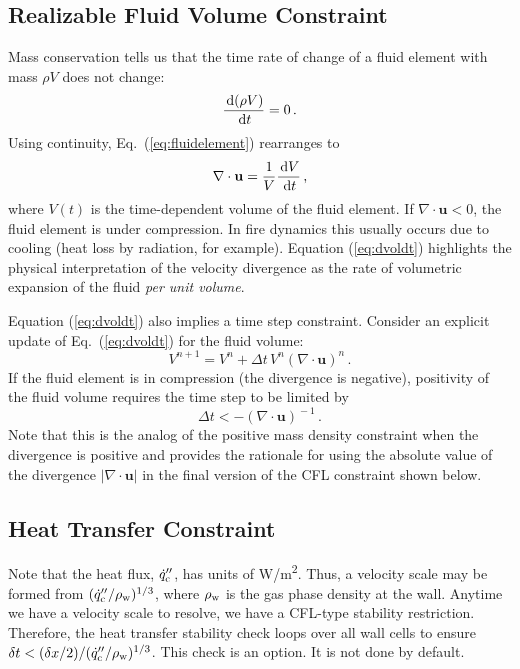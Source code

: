 \subsection{Realizable Fluid Volume Constraint}

Mass conservation tells us that the time rate of change of a fluid element with mass $\rho V$ does not change:
\begin{equation}
\label{eq:fluidelement}
\frac{\,\mathrm{d} (\rho V)}{\,\mathrm{d} t} = 0 \,\mbox{.}
\end{equation}
Using continuity, Eq.~(\ref{eq:fluidelement}) rearranges to
\begin{equation}
\label{eq:dvoldt}
\nabla\cdot\mathbf{u} = \frac{1}{V} \frac{\,\mathrm{d} V}{\,\mathrm{d} t} \,\mbox{,}
\end{equation}
where $V(t)$ is the time-dependent volume of the fluid element.  If $\nabla\cdot\mathbf{u}<0$, the fluid element is under compression.  In fire dynamics this usually occurs due to cooling (heat loss by radiation, for example).  Equation (\ref{eq:dvoldt}) highlights the physical interpretation of the velocity divergence as the rate of volumetric expansion of the fluid \emph{per unit volume}.

Equation (\ref{eq:dvoldt}) also implies a time step constraint.  Consider an explicit update of Eq.~(\ref{eq:dvoldt}) for the fluid volume:
\begin{equation}
V^{n+1} = V^n + \Delta t \, V^n (\nabla\cdot\mathbf{u})^{\!n} \,\mbox{.}
\end{equation}
If the fluid element is in compression (the divergence is negative), positivity of the fluid volume requires the time step to be limited by
\begin{equation}
\label{eq:volumedtrestriction}
\Delta t < -(\nabla\cdot\mathbf{u})^{\!-1} \,\mbox{.}
\end{equation}
Note that this is the analog of the positive mass density constraint when the divergence is positive and provides the rationale for using the absolute value of the divergence $|\nabla\cdot\mathbf{u}|$ in the final version of the CFL constraint shown below.

\subsection{Heat Transfer Constraint}

Note that the heat flux, $\dot{q}''_{\rm c}$, has units of \unit{W/m^2}.  Thus, a velocity scale may be formed from $(\dot{q}''_{\rm c}/\rho_{\rm w})^{1/3}$, where $\rho_{\rm w}$ is the gas phase density at the wall. Anytime we have a velocity scale to resolve, we have a CFL-type stability restriction. Therefore, the heat transfer stability check loops over all wall cells to ensure $\delta t < (\delta x/2) / (\dot{q}''_{\rm c}/\rho_{\rm w})^{1/3}$.  This check is an option. It is not done by default.

